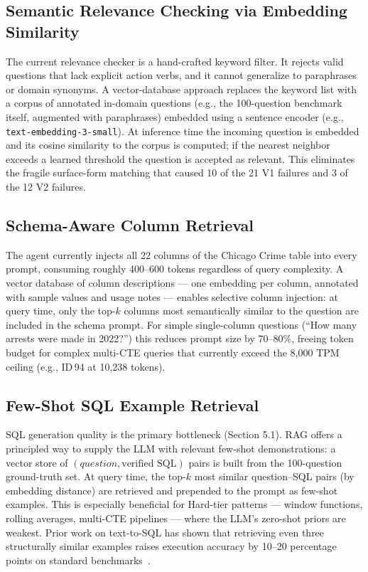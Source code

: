 \subsection{Semantic Relevance Checking via Embedding Similarity}

The current relevance checker is a hand-crafted keyword filter.  It rejects valid
questions that lack explicit action verbs, and it cannot generalize to
paraphrases or domain synonyms.  A vector-database approach replaces the keyword
list with a corpus of annotated in-domain questions (e.g., the 100-question
benchmark itself, augmented with paraphrases) embedded using a sentence encoder
(e.g., \texttt{text-embedding-3-small}).  At inference time the incoming question
is embedded and its cosine similarity to the corpus is computed; if the nearest
neighbor exceeds a learned threshold the question is accepted as relevant.  This
eliminates the fragile surface-form matching that caused 10 of the 21 V1 failures
and 3 of the 12 V2 failures.

\subsection{Schema-Aware Column Retrieval}

The agent currently injects all 22 columns of the Chicago Crime table into every
prompt, consuming roughly 400–600 tokens regardless of query complexity.  A
vector database of column descriptions — one embedding per column, annotated with
sample values and usage notes — enables selective column injection: at query time,
only the top-$k$ columns most semantically similar to the question are included
in the schema prompt.  For simple single-column questions (``How many arrests were
made in 2022?'') this reduces prompt size by 70–80\%, freeing token budget for
complex multi-CTE queries that currently exceed the 8,000 TPM ceiling (e.g.,
ID\,94 at 10,238 tokens).

\subsection{Few-Shot SQL Example Retrieval}

SQL generation quality is the primary bottleneck (Section 5.1).  RAG offers a
principled way to supply the LLM with relevant few-shot demonstrations: a vector
store of $(question, \text{verified SQL})$ pairs is built from the 100-question
ground-truth set.  At query time, the top-$k$ most similar question--SQL pairs
(by embedding distance) are retrieved and prepended to the prompt as few-shot
examples.  This is especially beneficial for Hard-tier patterns — window
functions, rolling averages, multi-CTE pipelines — where the LLM's zero-shot
priors are weakest.  Prior work on text-to-SQL has shown that retrieving even
three structurally similar examples raises execution accuracy by 10–20 percentage
points on standard benchmarks~\cite{guo2023prompting}.

